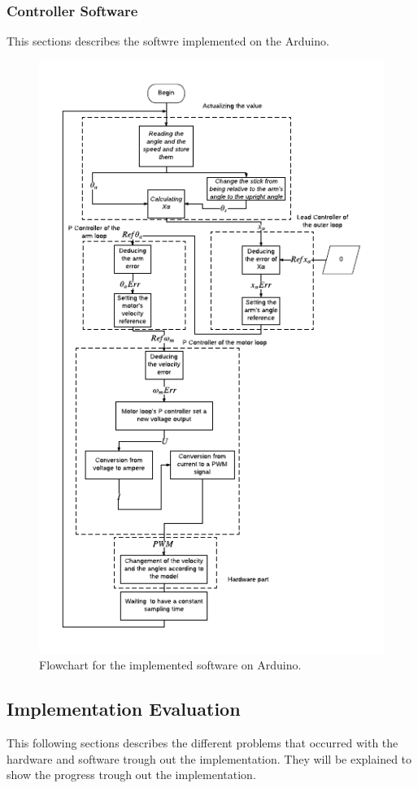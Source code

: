 \subsubsection{Controller Software}
This sections describes the softwre implemented on the Arduino. 
\begin{figure}[htbp]
\centering
\includegraphics[width=1\linewidth]{figures/Flowchart.pdf}
\caption{Flowchart for the implemented software on Arduino.}
\label{fig:Flowchart}
\end{figure}
\newpage
\subsection{Implementation Evaluation}
This following sections describes the different problems that occurred with the hardware and software trough out the implementation. They will be explained to show the progress trough out the implementation.
\\
